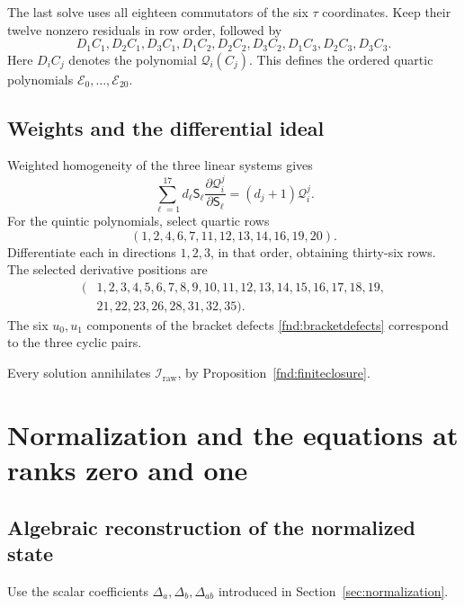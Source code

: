 \documentclass[11pt,a4paper]{article}
\numberwithin{equation}{section}
\theoremstyle{plain}
\theoremstyle{definition}
\theoremstyle{remark}
\begin{document}
The last solve uses all eighteen commutators of the six $\tau$ coordinates.
Keep their twelve nonzero residuals in row order, followed by
\[
 D_1C_1,D_2C_1,D_3C_1,
 D_1C_2,D_2C_2,D_3C_2,
 D_1C_3,D_2C_3,D_3C_3.
\]
Here $D_iC_j$ denotes the polynomial $\mathcal Q_i(C_j)$.
This defines the ordered quartic polynomials
$\mathcal E_0,\ldots,\mathcal E_{20}$.

\subsection{Weights and the differential ideal}

Weighted homogeneity of the three linear systems gives
\begin{equation}\label{appf:weightidentity}
 \sum_{\ell=1}^{17}d_\ell \mathsf S_\ell
       \frac{\partial\mathcal Q_i^j}{\partial \mathsf S_\ell}
 =(d_j+1)\mathcal Q_i^j.
\end{equation}
For the quintic polynomials, select quartic rows
\[
 (1,2,4,6,7,11,12,13,14,16,19,20).
\]
Differentiate each in directions $1,2,3$, in that order, obtaining
thirty-six rows. The selected derivative positions are
\[
 \begin{aligned}
 (&1,2,3,4,5,6,7,8,9,10,11,12,13,14,15,16,17,18,19,\\
  &21,22,23,26,28,31,32,35).
 \end{aligned}
\]
The six $u_0,u_1$ components of the bracket defects
\eqref{fnd:bracketdefects} correspond to the three cyclic pairs.

Every solution annihilates $\mathscr I_{\mathrm{raw}}$, by
Proposition~\ref{fnd:finiteclosure}.

\section{Normalization and the equations at ranks zero and one}
\label{appn:section}

\subsection{Algebraic reconstruction of the normalized state}
\label{appn:cubicreconstruction}
Use the scalar coefficients $\Delta_a,\Delta_b,\Delta_{ab}$ introduced in
Section~\ref{sec:normalization}.
\end{document}
